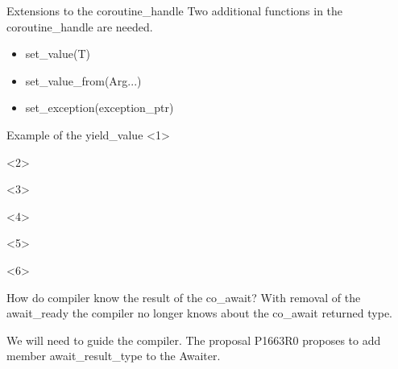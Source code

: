\documentclass[10pt]{beamer}
\begin{document}
\begin{frame}{Extensions to the coroutine\_handle}
	Two additional functions in the coroutine\_handle are needed.

	\begin{itemize}[<+-| alert@+>]
		\item set\_value(T)
		\item set\_value\_from(Arg...)
		\item set\_exception(exception\_ptr)
	\end{itemize}
	


\end{frame}

\begin{frame}{Example of the yield\_value}
<1>

<2>

<3>

<4>

<5>

<6>

\end{frame}

\begin{frame}{How do compiler know the result of the co\_await?}
	With removal of the \alert{await\_ready} the compiler no longer knows about the co\_await returned type.
	\vfill

	We will need to guide the compiler. The proposal 
	P1663R0 proposes to add member \alert{await\_result\_type} to the Awaiter.
	\vfill

\end{frame}
\end{document}
